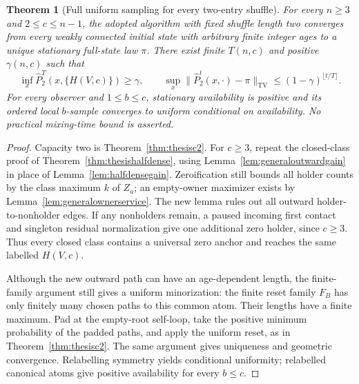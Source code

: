 \documentclass[11pt]{article}
\newtheorem{theorem}{Theorem}
\newcommand{\TV}{\mathrm{TV}}
\begin{document}
\begin{theorem}[Full uniform sampling for every two-entry shuffle]
\label{thm:thesisgeneraltwo}
For every $n\ge3$ and $2\le c\le n-1$, the adopted
algorithm with fixed shuffle length two converges
from every weakly connected initial state with
arbitrary finite integer ages to a unique stationary
full-state law $\pi$. There exist finite $T(n,c)$
and positive $\gamma(n,c)$ such that
\[
 \inf_x\widehat P_2^T(x,\{H(V,c)\})\ge\gamma,
 \qquad
 \sup_x\|\widehat P_2^t(x,\cdot)-\pi\|_{\TV}
       \le(1-\gamma)^{\lfloor t/T\rfloor}.
\]
For every observer and $1\le b\le c$, stationary
availability is positive and its ordered local
$b$-sample converges to uniform conditional on availability.
No practical mixing-time bound is asserted.
\end{theorem}
\begin{proof}
Capacity two is Theorem~\ref{thm:thesisc2}.
For $c\ge3$, repeat the closed-class proof of
Theorem~\ref{thm:thesishalfdense}, using
Lemma~\ref{lem:generaloutwardgain} in place of
Lemma~\ref{lem:halfdensegain}. Zeroification still
bounds all holder counts by the class maximum $k$
of $Z_a$; an empty-owner maximizer exists by
Lemma~\ref{lem:generalownerservice}. The new lemma
rules out all outward holder-to-nonholder edges.
If any nonholders remain, a paused incoming first
contact and singleton residual normalization give
one additional zero holder, since $c\ge3$.
Thus every closed class contains a universal zero
anchor and reaches the same labelled $H(V,c)$.

Although the new outward path can have an
age-dependent length, the finite-family argument
still gives a uniform minorization: the finite reset
family $F_B$ has only finitely many chosen paths to
this common atom. Their lengths have a finite maximum. Pad at the
empty-root self-loop, take the positive minimum probability
of the padded paths, and apply the uniform reset,
as in Theorem~\ref{thm:thesisc2}. The same argument
gives uniqueness and geometric convergence.
Relabelling symmetry yields conditional uniformity;
relabelled canonical atoms give positive availability
for every $b\le c$.
\end{proof}
\end{document}
